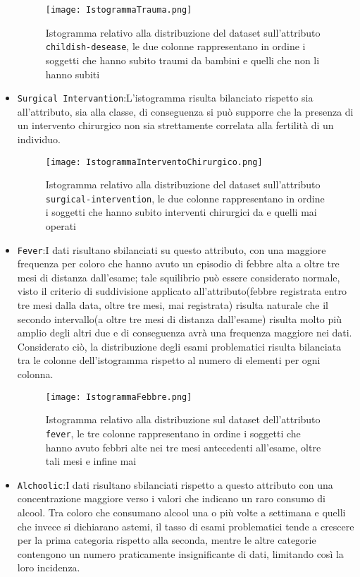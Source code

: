 \begin{itemize}
		\begin{figure}[H]
		\texttt{[image: IstogrammaTrauma.png]}
		\caption{Istogramma relativo alla distribuzione del dataset sull'attributo \texttt{childish-desease}, le due colonne rappresentano in ordine i soggetti che hanno subito traumi da bambini e quelli che non li hanno subiti}
	\end{figure}
	
	\item \texttt{Surgical Intervantion}:L'istogramma risulta bilanciato rispetto sia all'attributo, sia alla classe, di conseguenza si può supporre che la presenza di un intervento chirurgico non sia strettamente correlata alla fertilità di un individuo.
	
	\begin{figure}[H]
		\texttt{[image: IstogrammaInterventoChirurgico.png]}
		\caption{Istogramma relativo alla distribuzione del dataset sull'attributo \texttt{surgical-intervention}, le due colonne rappresentano in ordine i soggetti che hanno subito interventi chirurgici da e quelli mai operati}
	\end{figure}
	
	\item \texttt{Fever}:I dati risultano sbilanciati su questo attributo, con una maggiore frequenza per coloro che hanno avuto un episodio di febbre alta a oltre tre mesi di distanza dall'esame; tale squilibrio può essere considerato normale, visto il criterio di suddivisione applicato all'attributo(febbre registrata entro tre mesi dalla data, oltre tre mesi, mai registrata) risulta naturale che il secondo intervallo(a oltre tre mesi di distanza dall'esame) risulta molto più amplio degli altri due e di conseguenza avrà una frequenza maggiore nei dati.
	Considerato ciò, la distribuzione degli esami problematici risulta bilanciata tra le colonne dell'istogramma rispetto al numero di elementi per ogni colonna. 
	
	\begin{figure}[H]
		\texttt{[image: IstogrammaFebbre.png]}
		\caption{Istogramma relativo alla distribuzione sul dataset dell'attributo \texttt{fever}, le tre colonne rappresentano in ordine i soggetti che hanno avuto febbri alte nei tre mesi antecedenti all'esame, oltre tali mesi e infine mai}
	\end{figure}
	
	\item \texttt{Alchoolic}:I dati risultano sbilanciati rispetto a questo attributo con una concentrazione maggiore verso i valori che indicano un raro consumo di alcool. Tra coloro che consumano alcool una o più volte a settimana e quelli che invece si dichiarano astemi, il tasso di esami problematici tende a crescere per la prima categoria rispetto alla seconda, mentre le altre categorie contengono un numero praticamente insignificante di dati, limitando così la loro incidenza.
	

\end{itemize}
